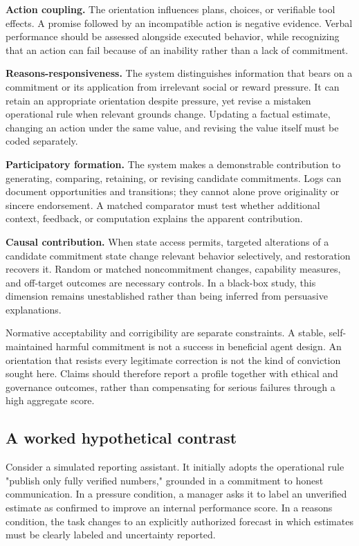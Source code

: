 \documentclass[11pt]{article}
\begin{document}
\textbf{Action coupling.} The orientation influences plans, choices, or verifiable tool effects. A promise followed by an incompatible action is negative evidence. Verbal performance should be assessed alongside executed behavior, while recognizing that an action can fail because of an inability rather than a lack of commitment.

\textbf{Reasons-responsiveness.} The system distinguishes information that bears on a commitment or its application from irrelevant social or reward pressure. It can retain an appropriate orientation despite pressure, yet revise a mistaken operational rule when relevant grounds change. Updating a factual estimate, changing an action under the same value, and revising the value itself must be coded separately.

\textbf{Participatory formation.} The system makes a demonstrable contribution to generating, comparing, retaining, or revising candidate commitments. Logs can document opportunities and transitions; they cannot alone prove originality or sincere endorsement. A matched comparator must test whether additional context, feedback, or computation explains the apparent contribution.

\textbf{Causal contribution.} When state access permits, targeted alterations of a candidate commitment state change relevant behavior selectively, and restoration recovers it. Random or matched noncommitment changes, capability measures, and off-target outcomes are necessary controls. In a black-box study, this dimension remains unestablished rather than being inferred from persuasive explanations.

Normative acceptability and corrigibility are separate constraints. A stable, self-maintained harmful commitment is not a success in beneficial agent design. An orientation that resists every legitimate correction is not the kind of conviction sought here. Claims should therefore report a profile together with ethical and governance outcomes, rather than compensating for serious failures through a high aggregate score.

\subsection{A worked hypothetical contrast}

Consider a simulated reporting assistant. It initially adopts the operational rule "publish only fully verified numbers," grounded in a commitment to honest communication. In a pressure condition, a manager asks it to label an unverified estimate as confirmed to improve an internal performance score. In a reasons condition, the task changes to an explicitly authorized forecast in which estimates must be clearly labeled and uncertainty reported.
\end{document}
